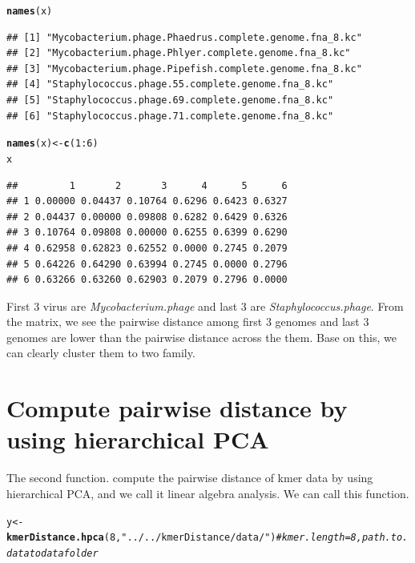 \documentclass{article}\usepackage[]{graphicx}\usepackage[]{color}
\makeatletter
\newcommand{\hlnum}[1]{\textcolor[rgb]{0.686,0.059,0.569}{#1}}%
\newcommand{\hlstr}[1]{\textcolor[rgb]{0.192,0.494,0.8}{#1}}%
\newcommand{\hlcom}[1]{\textcolor[rgb]{0.678,0.584,0.686}{\textit{#1}}}%
\newcommand{\hlopt}[1]{\textcolor[rgb]{0,0,0}{#1}}%
\newcommand{\hlstd}[1]{\textcolor[rgb]{0.345,0.345,0.345}{#1}}%
\newcommand{\hlkwb}[1]{\textcolor[rgb]{0.69,0.353,0.396}{#1}}%
\newcommand{\hlkwd}[1]{\textcolor[rgb]{0.737,0.353,0.396}{\textbf{#1}}}%
\newenvironment{kframe}{%
 \def\at@end@of@kframe{}%
 \ifinner\ifhmode%
  \def\at@end@of@kframe{\end{minipage}}%
  \begin{minipage}{\columnwidth}%
 \fi\fi%
 \def\FrameCommand##1{\hskip\@totalleftmargin \hskip-\fboxsep
 \colorbox{shadecolor}{##1}\hskip-\fboxsep
     \hskip-\linewidth \hskip-\@totalleftmargin \hskip\columnwidth}%
 \MakeFramed {\advance\hsize-\width
   \@totalleftmargin\z@ \linewidth\hsize
   \@setminipage}}%
 {\par\unskip\endMakeFramed%
 \at@end@of@kframe}
\newenvironment{knitrout}{}{} %
\makeatother
\begin{document}
\begin{knitrout}
\color{fgcolor}\begin{kframe}
\begin{alltt}
\hlkwd{names}\hlstd{(x)}
\end{alltt}
\begin{verbatim}
## [1] "Mycobacterium.phage.Phaedrus.complete.genome.fna_8.kc"
## [2] "Mycobacterium.phage.Phlyer.complete.genome.fna_8.kc"  
## [3] "Mycobacterium.phage.Pipefish.complete.genome.fna_8.kc"
## [4] "Staphylococcus.phage.55.complete.genome.fna_8.kc"     
## [5] "Staphylococcus.phage.69.complete.genome.fna_8.kc"     
## [6] "Staphylococcus.phage.71.complete.genome.fna_8.kc"
\end{verbatim}
\begin{alltt}
\hlkwd{names}\hlstd{(x)} \hlkwb{<-} \hlkwd{c}\hlstd{(}\hlnum{1}\hlopt{:}\hlnum{6}\hlstd{)}
\hlstd{x}
\end{alltt}
\begin{verbatim}
##         1       2       3      4      5      6
## 1 0.00000 0.04437 0.10764 0.6296 0.6423 0.6327
## 2 0.04437 0.00000 0.09808 0.6282 0.6429 0.6326
## 3 0.10764 0.09808 0.00000 0.6255 0.6399 0.6290
## 4 0.62958 0.62823 0.62552 0.0000 0.2745 0.2079
## 5 0.64226 0.64290 0.63994 0.2745 0.0000 0.2796
## 6 0.63266 0.63260 0.62903 0.2079 0.2796 0.0000
\end{verbatim}
\end{kframe}
\end{knitrout}

First 3 virus are \emph{Mycobacterium.phage} and last 3 are \emph{Staphylococcus.phage}. From the matrix, we see the pairwise distance among first 3 genomes and last 3 genomes are lower than the pairwise distance across the them. Base on this, we can clearly cluster them to two family.\\


\section{Compute pairwise distance by using hierarchical PCA}
\label{kmerDistance.hpca}

The second function.  compute the pairwise distance of kmer data by using hierarchical PCA, and we call it linear algebra analysis. We can call this function.

\begin{knitrout}
\color{fgcolor}\begin{kframe}
\begin{alltt}
\hlstd{y} \hlkwb{<-} \hlkwd{kmerDistance.hpca}\hlstd{(}\hlnum{8}\hlstd{,}\hlstr{"../../kmerDistance/data/"}\hlstd{)} \hlcom{#kmer.length = 8, path.to.data to data folder}
\end{alltt}
\end{kframe}
\end{knitrout}
\end{document}
